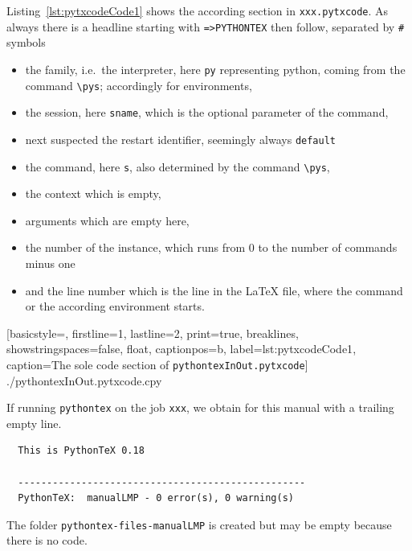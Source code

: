 \documentclass[a4paper, english]{article}%
\newcommand{\cmd}[1]{\texttt{\textbackslash#1}}
\begin{document}
Listing~\ref{lst:pytxcodeCode1} shows the according section in \texttt{xxx.pytxcode}. 
As always there is a headline starting with \texttt{=>PYTHONTEX} 
then follow, separated by \texttt\# symbols 
%
\begin{itemize}
  \item the family, i.e.~the interpreter, here \texttt{py} representing python, 
  coming from the command \cmd{pys}; 
  accordingly for environments, 
  \item the session, here \texttt{sname}, 
  which is the optional parameter of the command, 
  \item next suspected the restart identifier, seemingly always \texttt{default}
  \item the command, here \texttt{s}, 
  also determined by the command \cmd{pys}, 
  \item the context which is empty, %
  \item arguments which are empty here, 
  \item the number of the instance, which runs from 0 to the number of commands minus one 
  \item and the line number which is the line in the \LaTeX{} file, 
  where the command or the according environment starts. 
\end{itemize}


%
[basicstyle=\scriptsize,
firstline=1, lastline=2, print=true,
breaklines, showstringspaces=false,
float,
captionpos=b, label={lst:pytxcodeCode1},
caption={The sole code section of \texttt{pythontexInOut.pytxcode}}]
{./pythontexInOut.pytxcode.cpy}


If running \texttt{pythontex} on the job \texttt{xxx}, 
we obtain for this manual with a trailing empty line. 
%
\begin{verbatim}
  This is PythonTeX 0.18

  --------------------------------------------------
  PythonTeX:  manualLMP - 0 error(s), 0 warning(s)  
\end{verbatim}

The folder \texttt{pythontex-files-manualLMP} is created 
but may be empty because there is no code. %
\end{document}
